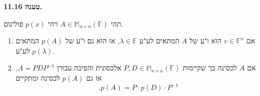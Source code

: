 \documentclass[12pt]{report}
\theoremstyle{plain}
\theoremstyle{definition}
\newcommand{\F}{\mathbb{F}}
\newcommand{\M}{\mathbb{M}}
\newcommand{\0}{\mathbf{0}}
\begin{document}
\noindent\textbf{טענה 11.16.}

תהי
$A\in\M_{n\times n}(\F)$
ויהי
$p(x)$
פולינום.
\begin{enumerate}[label=\alph*.]
\item 
אם
$v\in\F^n$
הוא ו"ע של 
$A$
המתאים לע"ע
$\lambda\in\F$,
אז הוא גם ו"ע של
$p(A)$
המתאים לע"ע
$p(\lambda)$.


\item
אם
$A$
לכסינה כך שקיימות
$P,D\in\M_{n\times n}(\F)$
אלכסונית והפיכה עבורן
$A=PDP^{-1}$,
אז גם
$p(A)$
לכסינה ומתקיים
$$
.p(A)=P\cdot p(D)\cdot P^{-1}
$$


\end{enumerate}
\bigskip
\bigskip
\end{document}

